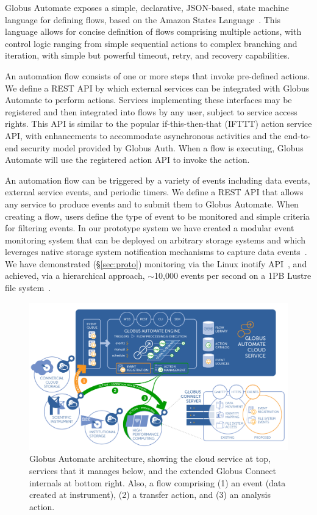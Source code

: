 \documentclass{aip-cp}
\begin{document}
Globus Automate exposes a simple, declarative, JSON-based, state machine 
language for defining flows, 
based on the Amazon States Language~\cite{AmazonStates}. 
This language allows for concise definition of flows comprising multiple actions, with control logic 
ranging from simple sequential actions to complex branching and iteration, with simple but powerful 
timeout, retry, and recovery capabilities. 

An automation flow consists of one or more steps that invoke pre-defined actions. 
We define a REST API by which external services can be integrated with Globus Automate to perform 
actions. 
Services implementing these interfaces may
be registered and then integrated into flows by any user, subject to service access rights. 
This API is similar to the popular if-this-then-that (IFTTT) action service API, 
with enhancements to accommodate asynchronous activities and the end-to-end security model provided 
by Globus Auth. When a flow is executing, Globus Automate will use
the registered action API to invoke the action.

An automation flow can be triggered by a variety of events including 
data events, external service events, and periodic timers.
We define a REST API that allows any service to produce events
and to submit them to Globus Automate. When creating a flow, 
users define the type of event to be monitored and simple criteria
for filtering events. 
In our prototype system we have created a modular event monitoring system that
can be deployed on arbitrary storage systems and which leverages
native storage system notification mechanisms to capture data events~\cite{chard17ripple}. 
We have demonstrated (\S\ref{sec:proto}) monitoring via the Linux
inotify API~\cite{inotify}, and achieved, via a hierarchical approach, 
$\sim$10,000 events per second on a 1PB Lustre file system~\cite{paul17scalable}.  

\begin{figure}[h]
  \centerline{\includegraphics[width=6in]{Figs/automate.png}}
  \caption{Globus Automate architecture, showing the cloud service at top, services that it
    manages below, and the extended Globus Connect internals at bottom right. Also, a flow
    comprising 
    (1) an event (data created at instrument), (2) a transfer action, and (3) an analysis action.
\label{fig:diffuse}}
\end{figure}
\end{document}
